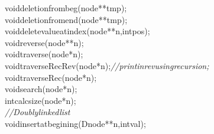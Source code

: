 \documentclass[a4paper, 9pt]{article}
\newcommand\SPC{\hspace*{0.6em}}
\newcommand{\CppAComment}[1]{\textit{\textcolor[rgb]{0.4,0.45,0.48}{#1}}}
\newcommand{\CppAIdentifier}[1]{\textcolor[rgb]{0.88,0.89,0.89}{#1}}
\newcommand{\CppAReservedWord}[1]{\textcolor[rgb]{0.4,0.55,0.69}{#1}}
\newcommand{\CppASpace}[1]{\colorbox[rgb]{0.16,0.19,0.2}{#1}}
\newcommand{\CppASymbol}[1]{\textcolor[rgb]{0.91,0.89,0.72}{#1}}
\begin{document}
\begin{ttfamily}
\CppAReservedWord{void}\CppASpace{\SPC }\CppAIdentifier{deletionfrombeg}\CppASymbol{(}\CppAIdentifier{node}\CppASymbol{*}\CppASymbol{*}\CppASpace{\SPC }\CppAIdentifier{tmp}\CppASpace{\SPC }\CppASymbol{)}\CppASymbol{;}\\
\CppAReservedWord{void}\CppASpace{\SPC }\CppAIdentifier{deletionfromend}\CppASymbol{(}\CppAIdentifier{node}\CppASymbol{*}\CppASymbol{*}\CppASpace{\SPC }\CppAIdentifier{tmp}\CppASpace{\SPC }\CppASymbol{)}\CppASymbol{;}\\
\CppAReservedWord{void}\CppASpace{\SPC }\CppAIdentifier{deletevalueatindex}\CppASymbol{(}\CppAIdentifier{node}\CppASymbol{*}\CppASymbol{*}\CppASpace{\SPC }\CppAIdentifier{n}\CppASymbol{,}\CppAReservedWord{int}\CppASpace{\SPC }\CppAIdentifier{pos}\CppASymbol{)}\CppASymbol{;}\\
\CppAReservedWord{void}\CppASpace{\SPC }\CppAIdentifier{reverse}\CppASymbol{(}\CppAIdentifier{node}\CppASymbol{*}\CppASymbol{*}\CppASpace{\SPC }\CppAIdentifier{n}\CppASymbol{)}\CppASymbol{;}\\
\CppAReservedWord{void}\CppASpace{\SPC }\CppAIdentifier{traverse}\CppASymbol{(}\CppAIdentifier{node}\CppASymbol{*}\CppASpace{\SPC }\CppAIdentifier{n}\CppASymbol{)}\CppASymbol{;}\\
\CppAReservedWord{void}\CppASpace{\SPC }\CppAIdentifier{traverseRecRev}\CppASymbol{(}\CppAIdentifier{node}\CppASymbol{*}\CppASpace{\SPC }\CppAIdentifier{n}\CppASymbol{)}\CppASymbol{;}\CppAComment{//print\SPC in\SPC rev\SPC using\SPC recursion;}\\
\CppAReservedWord{void}\CppASpace{\SPC }\CppAIdentifier{traverseRec}\CppASymbol{(}\CppAIdentifier{node}\CppASymbol{*}\CppASpace{\SPC }\CppAIdentifier{n}\CppASymbol{)}\CppASymbol{;}\\
\CppAReservedWord{void}\CppASpace{\SPC }\CppAIdentifier{search}\CppASymbol{(}\CppAIdentifier{node}\CppASymbol{*}\CppASpace{\SPC }\CppAIdentifier{n}\CppASymbol{)}\CppASymbol{;}\\
\CppAReservedWord{int}\CppASpace{\SPC }\CppAIdentifier{calcsize}\CppASymbol{(}\CppAIdentifier{node}\CppASpace{\SPC }\CppASymbol{*}\CppAIdentifier{n}\CppASymbol{)}\CppASymbol{;}\\
\CppAComment{//Doublylinkedlist}\\
\CppAReservedWord{void}\CppASpace{\SPC }\CppAIdentifier{insertatbegining}\CppASymbol{(}\CppASpace{\SPC }\CppAIdentifier{Dnode}\CppASymbol{*}\CppASymbol{*}\CppASpace{\SPC }\CppAIdentifier{n}\CppASymbol{,}\CppAReservedWord{int}\CppASpace{\SPC }\CppAIdentifier{val}\CppASymbol{)}\CppASymbol{;}\\

\end{ttfamily}
\end{document}
